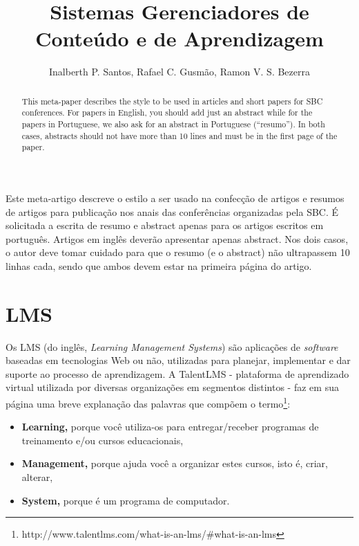 \documentclass[12pt]{article}
\title{Sistemas Gerenciadores de Conteúdo e de Aprendizagem}
\author{Inalberth P. Santos\inst{1}, Rafael C. Gusmão\inst{1}, Ramon V. S. Bezerra\inst{1}}
\begin{document}
 

\maketitle

\begin{abstract}
  This meta-paper describes the style to be used in articles and short papers
  for SBC conferences. For papers in English, you should add just an abstract
  while for the papers in Portuguese, we also ask for an abstract in
  Portuguese (``resumo''). In both cases, abstracts should not have more than
  10 lines and must be in the first page of the paper.
\end{abstract}
     
\begin{resumo} 
  Este meta-artigo descreve o estilo a ser usado na confecção de artigos e
  resumos de artigos para publicação nos anais das conferências organizadas
  pela SBC. É solicitada a escrita de resumo e abstract apenas para os artigos
  escritos em português. Artigos em inglês deverão apresentar apenas abstract.
  Nos dois casos, o autor deve tomar cuidado para que o resumo (e o abstract)
  não ultrapassem 10 linhas cada, sendo que ambos devem estar na primeira
  página do artigo.
\end{resumo}

\section{LMS} \label{sec:lms}

Os LMS (do inglês, \textit{Learning Management Systems}) são aplicações de \textit{software} baseadas em tecnologias Web ou não, utilizadas para 
planejar, implementar e dar suporte ao processo de aprendizagem. A TalentLMS \-- plataforma de aprendizado virtual utilizada por diversas 
organizações em segmentos distintos \-- faz em sua página uma breve explanação das 
palavras que compõem o termo\footnote{http://www.talentlms.com/what-is-an-lms/\#what-is-an-lms}:

\begin{itemize}
 \item \textbf{Learning,} porque você utiliza-os para entregar/receber programas de treinamento e/ou cursos educacionais, 
 \item \textbf{Management,} porque ajuda você a organizar estes cursos, isto é, criar, alterar,
 \item \textbf{System, } porque é um programa de computador.
\end{itemize}
\end{document}
